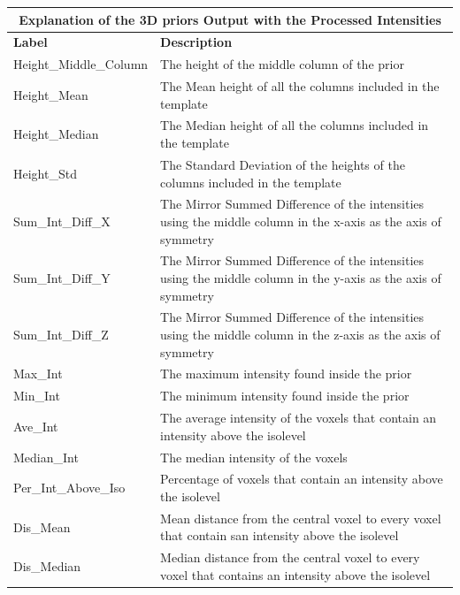 \documentclass{subfiles}
\begin{document}
\newpage
	\begin{longtable}
		{|p{4.65cm}|p{9.45cm}|}
		\toprule
		\multicolumn{2}{|c|}{\textbf{Explanation of the 3D priors Output with the Processed Intensities}} \\
		\midrule
		\textbf{Label} & \textbf{Description} \\ 
		\cmidrule(r){1-1}\cmidrule(l){2-2}
		Height\_Middle\_Column& The height of the middle column of the prior
		\\
		\cmidrule(r){1-1}\cmidrule(l){2-2}
		Height\_Mean& The Mean height of all the columns included in the template\\
		\cmidrule(r){1-1}\cmidrule(l){2-2}
		Height\_Median& The Median height of all the columns included in the template
		\\
		\cmidrule(r){1-1}\cmidrule(l){2-2}
		Height\_Std&The Standard Deviation of the heights of the columns included in the template \\
		\cmidrule(r){1-1}\cmidrule(l){2-2}
		Sum\_Int\_Diff\_X& The Mirror Summed Difference of the intensities using the middle column in the x-axis as the axis of symmetry \\
		\cmidrule(r){1-1}\cmidrule(l){2-2}
		Sum\_Int\_Diff\_Y& The Mirror Summed Difference of the intensities using the middle column in the y-axis as the axis of symmetry\\
		\cmidrule(r){1-1}\cmidrule(l){2-2}
		Sum\_Int\_Diff\_Z& The Mirror Summed Difference of the intensities using the middle column in the z-axis as the axis of symmetry\\
		\cmidrule(r){1-1}\cmidrule(l){2-2}
		Max\_Int& The maximum intensity found inside the prior\\
		\cmidrule(r){1-1}\cmidrule(l){2-2}
		Min\_Int& The minimum intensity found inside the prior\\
		\cmidrule(r){1-1}\cmidrule(l){2-2}
		Ave\_Int& The average intensity of the voxels that contain an intensity above the isolevel\\
		\cmidrule(r){1-1}\cmidrule(l){2-2}
		Median\_Int& The median intensity of the voxels\\
		\cmidrule(r){1-1}\cmidrule(l){2-2}
		Per\_Int\_Above\_Iso& Percentage of voxels that contain an intensity above the isolevel\\
		\cmidrule(r){1-1}\cmidrule(l){2-2}
		Dis\_Mean& Mean distance from the central voxel to every voxel that contain san intensity above the isolevel  \\
		\cmidrule(r){1-1}\cmidrule(l){2-2}
		Dis\_Median& Median distance from the central voxel to every voxel that contains an intensity above the isolevel \\

\end{longtable}
\end{document}

